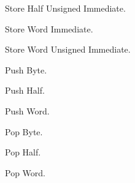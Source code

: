 \glqq Store Half Unsigned Immediate\grqq.



\glqq Store Word Immediate\grqq.



\glqq Store Word Unsigned Immediate\grqq.



\glqq Push Byte\grqq.



\glqq Push Half\grqq.



\glqq Push Word\grqq.



\glqq Pop Byte\grqq.


\glqq Pop Half\grqq.



\glqq Pop Word\grqq.


